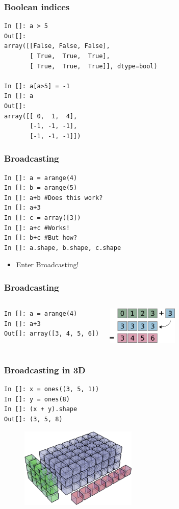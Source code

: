 \documentclass[14pt,compress]{beamer}
\newcounter{time}
\newcommand{\inctime}[1]{\addtocounter{time}{#1}{\tiny \thetime\ m}}
\begin{document}
\begin{frame}[fragile]
  \frametitle{Boolean indices}
  \vspace*{-1ex}
  \begin{lstlisting}
In []: a > 5
Out[]: 
array([[False, False, False],
       [ True,  True,  True],
       [ True,  True,  True]], dtype=bool)

In []: a[a>5] = -1
In []: a
Out[]: 
array([[ 0,  1,  4],
       [-1, -1, -1],
       [-1, -1, -1]])
  \end{lstlisting}
  \inctime{5}
\end{frame}


\begin{frame}[fragile]
  \frametitle{Broadcasting}
  \begin{lstlisting}
In []: a = arange(4)
In []: b = arange(5)
In []: a+b #Does this work?
In []: a+3
In []: c = array([3])
In []: a+c #Works!
In []: b+c #But how?
In []: a.shape, b.shape, c.shape
  \end{lstlisting}
  \begin{itemize}
    \item Enter Broadcasting!
  \end{itemize}
\end{frame}

\begin{frame}[fragile]
  \frametitle{Broadcasting}
  \begin{columns}
    \hspace*{-1.5in}
    \begin{lstlisting}
In []: a = arange(4)
In []: a+3
Out[]: array([3, 4, 5, 6])
    \end{lstlisting}
    \includegraphics[height=0.7in, interpolate=true]{data/broadcast_scalar}
  \end{columns}
\end{frame}

\begin{frame}[fragile]
  \frametitle{Broadcasting in 3D}
    \begin{lstlisting}
In []: x = ones((3, 5, 1))
In []: y = ones(8)
In []: (x + y).shape
Out[]: (3, 5, 8)
    \end{lstlisting}
    \begin{figure}
      \begin{center}
      \includegraphics[height=1.5in, interpolate=true]{data/array_3x5x8}        
      \end{center}
    \end{figure}
\end{frame}
\end{document}
